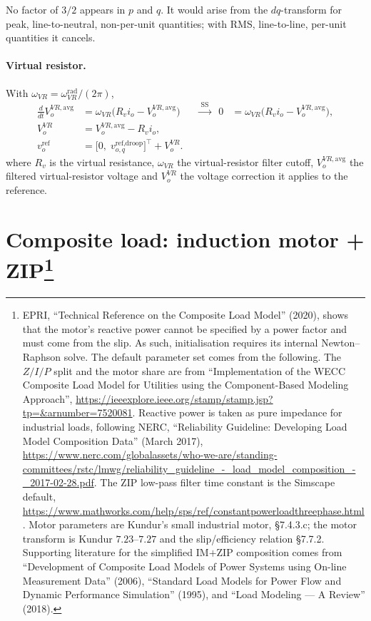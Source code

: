 \documentclass[11pt]{article}
\begin{document}
No factor of $3/2$ appears in $p$ and $q$. It would arise from the
$dq$-transform for peak, line-to-neutral, non-per-unit quantities; with
RMS, line-to-line, per-unit quantities it cancels.

\paragraph{Virtual resistor.}
With $\omega_{VR} = \omega_{VR}^{\text{rad}}/(2\pi)$,
\begin{align}
  \frac{d}{dt}V_o^{VR,\text{avg}} &= \omega_{VR}\big(R_v i_o - V_o^{VR,\text{avg}}\big)
    &&\xrightarrow{\;\text{SS}\;}& 0 &= \omega_{VR}\big(R_v i_o - V_o^{VR,\text{avg}}\big), \\
  V_o^{VR} &= V_o^{VR,\text{avg}} - R_v i_o, \\
  v_o^{\text{ref}} &= \big[0,\;v_{o,q}^{\text{ref,droop}}\big]^\top + V_o^{VR}.
\end{align}
where $R_v$ is the virtual resistance, $\omega_{VR}$ the virtual-resistor
filter cutoff, $V_o^{VR,\text{avg}}$ the filtered virtual-resistor voltage
and $V_o^{VR}$ the voltage correction it applies to the reference.

\section[Composite load: induction motor + ZIP]{Composite load: induction
motor + ZIP\protect\footnote{EPRI, ``Technical Reference on the Composite
Load Model'' (2020), shows that the motor's reactive power cannot be
specified by a power factor and must come from the slip. As such,
initialisation requires its internal Newton--Raphson solve. The default
parameter set comes from the following. The $Z/I/P$ split and the motor
share are from ``Implementation of the WECC Composite Load Model for
Utilities using the Component-Based Modeling Approach'',
\url{https://ieeexplore.ieee.org/stamp/stamp.jsp?tp=&arnumber=7520081}.
Reactive power is taken as pure impedance for industrial loads, following
NERC, ``Reliability Guideline: Developing Load Model Composition Data''
(March 2017),
\url{https://www.nerc.com/globalassets/who-we-are/standing-committees/rstc/lmwg/reliability_guideline_-_load_model_composition_-_2017-02-28.pdf}.
The ZIP low-pass filter time constant is the Simscape default,
\url{https://www.mathworks.com/help/sps/ref/constantpowerloadthreephase.html}.
Motor parameters are Kundur's small industrial motor, \S7.4.3.c; the motor
transform is Kundur $7.23$--$7.27$ and the slip/efficiency relation \S7.7.2.
Supporting literature for the simplified IM${+}$ZIP composition comes from
``Development of Composite Load Models of Power Systems using On-line
Measurement Data'' (2006), ``Standard Load Models for Power Flow and
Dynamic Performance Simulation'' (1995), and ``Load Modeling --- A
Review'' (2018).}}
\end{document}
